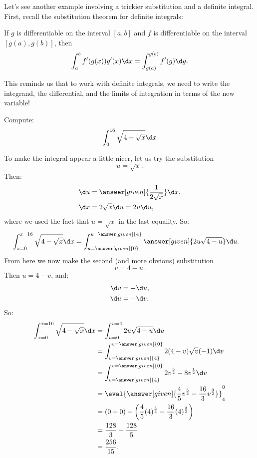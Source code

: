 \documentclass[nooutcomes]{ximera}
\begin{document}
Let's see another example involving a trickier substitution and a definite integral.  First, recall the substitution theorem for definite integrals:

\begin{theorem} 
If $g$ is differentiable on the interval $[a,b]$ and $f$ is
differentiable on the interval $[g(a),g(b)]$, then
\[
\int_a^b f'(g(x)) g'(x) \d x =\int_{g(a)}^{g(b)} f'(g) \d g.
\]
\end{theorem}

This reminds us that to work with definite integrals, we need to write the integrand, the differential, and the limits of integration in terms of the new variable!  

\begin{example}
Compute:
\[
\int_0^{16} \sqrt{4 - \sqrt{x}} \d x
\]
\begin{explanation}
To make the integral appear a little nicer, let us try the substitution
\[
u = \sqrt{x}.
\]
Then:
\begin{align*}
\d u &= \answer[given]{\frac{1}{2 \sqrt{x}}} \d x,\\
\d x &= 2 \sqrt{x} \d u = 2u \d u,
\end{align*}
where we used the fact that $u=\sqrt{x}$ in the last equality.  So:
\begin{align*}
\int_{x=0}^{x=16} \sqrt{4 - \sqrt{x}} \d x &=  \int_{u=\answer[given]{0}}^{u=\answer[given]{4}} \answer[given]{2u \sqrt{4-u}} \d u.
\end{align*}
From here we now make the second (and more obvious) substitution
\[
v = 4-u.
\]
Then $u = 4-v$, and: 
\begin{align*}
\d v &= - \d u,\\
\d u &= - \d v.
\end{align*}
So:
\begin{align*}
\int_{x=0}^{x=16} \sqrt{4 - \sqrt{x}} \d x &= \int_{u=0}^{u=4} 2u \sqrt{4-u} \d u  \\
&= \int_{v=\answer[given]{4}}^{v=\answer[given]{0}} 2 (4-v) \sqrt{v} (-1) \d v  \\
&= \int_{v=\answer[given]{4}}^{v=\answer[given]{0}} 2v^{\frac{3}{2}} - 8v^{\frac{1}{2}}  \d v  \\
&= \eval{ \answer[given]{  \frac{4}{5} v^{\frac{5}{2}} -  \frac{16}{3} v^{\frac{3}{2}} }}_{4}^{0}  \\
&=  \left( 0 - 0 \right) - \left(\frac{4}{5} (4)^{\frac{5}{2}} - \frac{16}{3} (4)^{\frac{3}{2}}  \right)   \\
&= \frac{128}{3} - \frac{128}{5}   \\
&= \frac{256}{15}.
\end{align*}
\end{explanation}
\end{example}
\end{document}
